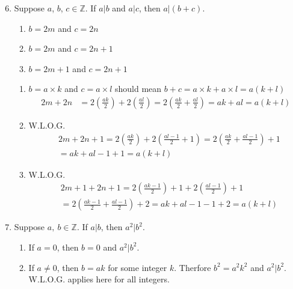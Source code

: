 \documentclass{article}
\begin{document}
\begin{enumerate}[label=\#\arabic*]
    \setcounter{enumi}{5}
    \item Suppose $a$, $b$, $c \in \mathbb{Z}$. If $a|b$ and $a|c$, then $a|(b + c)$.
    \begin{enumerate}[label=Case \arabic*:]
        \item $b = 2m$ and $c = 2n$
        \item $b = 2m$ and $c = 2n + 1$
        \item $b = 2m + 1$ and $c = 2n + 1$
    \end{enumerate}
    \begin{enumerate}[label=Proof \arabic*:]
        \item $b = a \times k$ and $c = a \times l$ should mean
        $b+c = a \times k + a \times l = a(k + l)$
        \[
            \begin{aligned}
                2m + 2n &= 2(\frac{ak}{2}) + 2(\frac{al}{2}) 
                = 2(\frac{ak}{2} + \frac{al}{2}) = ak + al = a(k + l)
            \end{aligned}
        \]
        \item W.L.O.G.
        \[
            \begin{aligned}
                &2m + 2n + 1 = 2(\frac{ak}{2}) + 2(\frac{al - 1}{2} + 1)
                = 2(\frac{ak}{2} + \frac{al - 1}{2}) + 1 \\
                &= ak + al - 1 + 1 = a(k + l)
            \end{aligned}
        \]
        \item W.L.O.G.
        \[
            \begin{aligned}
                &2m + 1 + 2n + 1 = 2(\frac{ak - 1}{2}) + 1 + 2(\frac{al - 1}{2}) + 1 \\
                &= 2(\frac{ak - 1}{2} + \frac{al - 1}{2}) + 2 = ak + al - 1 - 1 + 2 = a(k + l)
            \end{aligned}
        \]
    \end{enumerate}
    \item  Suppose $a, \ b \in \mathbb{Z}$. If $a|b$, then $a^2|b^2$.
    \begin{enumerate}[label=Case \arabic*:]
        \item If $a = 0$, then $b = 0$ and $a^2 | b^2$.
        \item If $a \neq 0$, then $b = ak$ for some integer $k$. Therfore $b^2 = a^2k^2$ and $a^2 | b^2$. W.L.O.G. applies here for all integers.
    \end{enumerate}


\end{enumerate}
\end{document}
